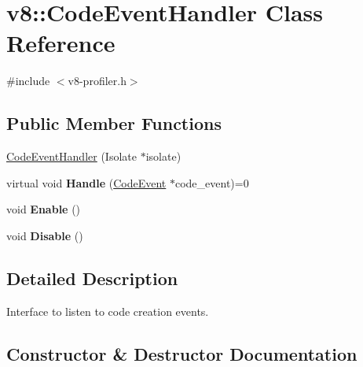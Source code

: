 \hypertarget{classv8_1_1CodeEventHandler}{}\section{v8\+:\+:Code\+Event\+Handler Class Reference}
\label{classv8_1_1CodeEventHandler}


{\ttfamily \#include $<$v8-\/profiler.\+h$>$}

\subsection*{Public Member Functions}
\begin{DoxyCompactItemize}
\item 
\mbox{\hyperlink{classv8_1_1CodeEventHandler_a3d88d7de87c3b51d964ab5c8cc06dc03}{Code\+Event\+Handler}} (Isolate $\ast$isolate)
\item 
\mbox{\label{classv8_1_1CodeEventHandler_a61d0870a92c4b814ea5dbe29acf463c6}} 
virtual void {\bfseries Handle} (\mbox{\hyperlink{classv8_1_1CodeEvent}{Code\+Event}} $\ast$code\+\_\+event)=0
\item 
\mbox{\label{classv8_1_1CodeEventHandler_a3691182a45ff92e7d421c3a17bda305f}} 
void {\bfseries Enable} ()
\item 
\mbox{\label{classv8_1_1CodeEventHandler_a9024641a77703a601dcdf840b888ff05}} 
void {\bfseries Disable} ()
\end{DoxyCompactItemize}


\subsection{Detailed Description}
Interface to listen to code creation events. 

\subsection{Constructor \& Destructor Documentation}
\mbox{\label{classv8_1_1CodeEventHandler_a3d88d7de87c3b51d964ab5c8cc06dc03}} 
